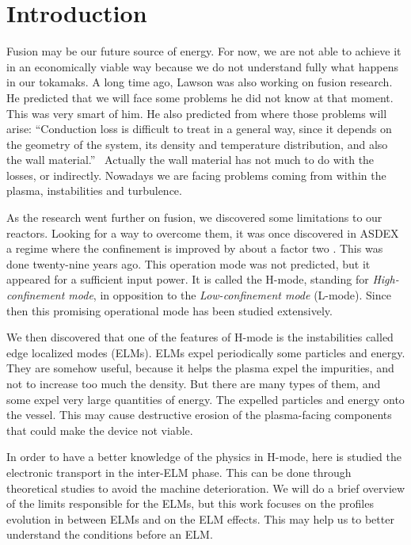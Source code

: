 \chapter{Introduction}\thispagestyle{fancy}
Fusion may be our future source of energy. For now, we are not able to achieve it in an economically viable way because we do not understand fully what happens in our tokamaks. A long time ago, Lawson was also working on fusion research. He predicted that we will face some problems he did not know at that moment. This was very smart of him. He also predicted from where those problems will arise: ``Conduction loss is difficult to treat in a general way, since it depends on the geometry of the system, its density and temperature distribution, and also the wall material.'' \cite{lawson}\ Actually the wall material has not much to do with the losses, or indirectly. Nowadays we are facing problems coming from within the plasma, instabilities and turbulence.

As the research went further on fusion, we discovered some limitations to our reactors. Looking for a way to overcome them, it was once discovered in ASDEX a regime where the confinement is improved by about a factor two \cite{iterNews}. This was done twenty-nine years ago. This operation mode was not predicted, but it appeared for a sufficient input power. It is called the H-mode, standing for \emph{High-confinement mode}, in opposition to the \emph{Low-confinement mode} (L-mode). Since then this promising operational mode has been studied extensively.

We then discovered that one of the features of H-mode is the instabilities called edge localized modes (ELMs). ELMs expel periodically some particles and energy. They are somehow useful, because it helps the plasma expel the impurities, and not to increase too much the density. But there are many types of them, and some expel very large quantities of energy. The expelled particles and energy onto the vessel. This may cause destructive erosion of the plasma-facing components that could make the device not viable.

In order to have a better knowledge of the physics in H-mode, here is studied the electronic transport in the inter-ELM phase. This can be done through theoretical studies to avoid the machine deterioration. We will do a brief overview of the limits responsible for the ELMs, but this work focuses on the profiles evolution in between ELMs and on the ELM effects. This may help us to better understand the conditions before an ELM.

